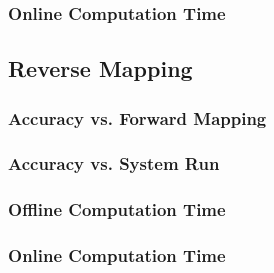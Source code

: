   \subsubsection{Online Computation Time}

 \subsection{Reverse Mapping}

  \subsubsection{Accuracy vs. Forward Mapping}

  \subsubsection{Accuracy vs. System Run}

  \subsubsection{Offline Computation Time}

  \subsubsection{Online Computation Time}
